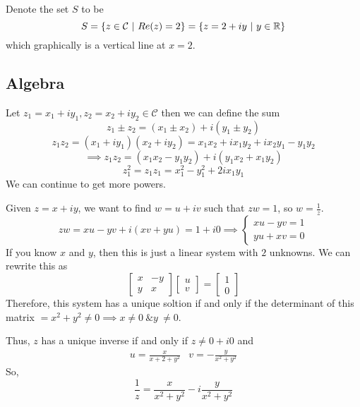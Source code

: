 \documentclass[12pt]{scrartcl}
\newcommand{\C}{\mathcal{C}}
\begin{document}
\begin{example}
  Denote the set $S$ to be
  \[S = \{z \in \C \ | \ Re(z) = 2\} = \{z = 2 + iy \ | \ y \in \RR\}\]
  which graphically is a vertical line at $x = 2$. 
\end{example}

\subsection{Algebra}

\begin{definition}
  Let $z_1 = x_1 + iy_1, z_2 = x_2 + iy_2 \in \C$ then we can define the sum 
  \[z_1 \pm z_2 = (x_1 \pm x_2) + i(y_1 \pm y_2)\]
  \[z_1z_2 = (x_1 + iy_1)(x_2 + iy_2) = x_1x_2 + ix_1y_2 + ix_2y_1 - y_1y_2\]
  \[\implies z_1z_2 = (x_1x_2 - y_1y_2) + i(y_1x_2 + x_1y_2)\]
  \[z_1^2 = z_1z_1 = x_1^2 - y_1^2 + 2ix_1y_1\]
  We can continue to get more powers.
\end{definition}

\begin{definition}[Inverse]
  Given $z = x + iy$, we want to find $w = u + iv$ such that $zw = 1$, so $w = \frac{1}{z}$.
  \[zw = xu - yv + i(xv + yu) = 1 + i0 \implies \begin{cases}
    xu - yv = 1\\
    yu + xv = 0
  \end{cases}\]
  If you know $x$ and $y$, then this is just a linear system with $2$ unknowns. We can rewrite this as 
  \[\begin{bmatrix}
    x & -y \\ y & x
  \end{bmatrix} \begin{bmatrix}
    u \\ v
  \end{bmatrix} = \begin{bmatrix}
    1 \\ 0
  \end{bmatrix}\]
  Therefore, this system has a unique soltion if and only if the determinant of this matrix $= x^2 + y^2 \neq 0 \implies x \neq 0 \ \& y \ \neq 0$. 

  Thus, $z$ has a unique inverse if and only if $z \neq 0 + i0$ and 
  \begin{align*}
    u = \frac{x}{x+2 + y^2} & v = -\frac{y}{x^2 + y^2}
  \end{align*}
  So, 
  \[\frac{1}{z} = \frac{x}{x^2 + y^2} - i\frac{y}{x^2 + y^2}\]
\end{definition}
\end{document}
